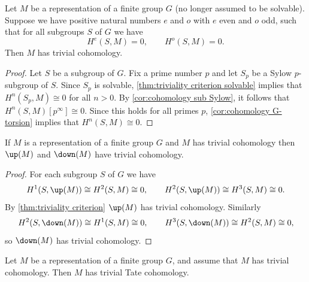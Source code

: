 \begin{theorem} \label{thm:triviality criterion}
	\leanok
	Let $M$ be a representation of a finite group $G$ (no longer assumed to be solvable).
	Suppose we have positive natural numbers $e$ and $o$ with $e$ even and $o$ odd, such that for all
	subgroups $S$ of $G$ we have
	\[
		H^e(S,M) =0, \qquad H^o(S,M) = 0.
	\]
	Then $M$ has trivial cohomology.
\end{theorem}

\begin{proof}
	Let $S$ be a subgroup of $G$.
	Fix a prime number $p$ and let $S_p$ be a Sylow $p$-subgroup of $S$.
	Since $S_p$ is solvable, \ref{thm:triviality criterion solvable} implies that
	$H^n(S_p,M) \cong 0$ for all $n > 0$.
	By \ref{cor:cohomology sub Sylow}, it follows that $H^n(S,M)[p^\infty] \cong 0$.
	Since this holds for all primes $p$,
	\ref{cor:cohomology G-torsion} implies that $H^n(S,M) \cong 0$.
\end{proof}

\begin{corollary}	\label{cor:up and down trivial cohomology}
	\leanok
	If $M$ is a representation of a finite group $G$ and $M$ has trivial cohomology
	then $\up(M)$ and $\down(M)$ have trivial cohomology.
\end{corollary}

\begin{proof}
	For each subgroup $S$ of $G$ we have
	\[
		H^1(S,\up(M)) \cong H^2(S,M) \cong 0,
		\qquad
		H^2(S,\up(M)) \cong H^3(S,M) \cong 0.
	\]
	By \ref{thm:triviality criterion} $\up(M)$ has trivial cohomology.
	Similarly
	\[
		H^2(S,\down(M)) \cong H^1(S,M) \cong 0,
		\qquad
		H^3(S,\down(M)) \cong H^2(S,M) \cong 0,
	\]
	so $\down(M)$ has trivial cohomology.
\end{proof}

\begin{theorem} \label{thm:trivial cohomology implies trivial Tate}
	Let $M$ be a representation of a finite group $G$, and assume that $M$ has trivial cohomology.
	Then $M$ has trivial Tate cohomology.
\end{theorem}

